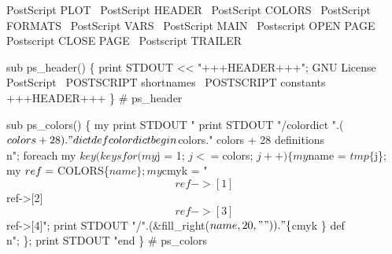 \documentclass[11pt]{article}
\def\nwendcode{\endtrivlist \endgroup} %
\let\nwdocspar=\par                    %
\begin{document}
\nwenddocs{}\endmoddef
\LA{}PostScript PLOT~{\nwtagstyle{}}\RA{}
\LA{}PostScript HEADER~{\nwtagstyle{}}\RA{}
\LA{}PostScript COLORS~{\nwtagstyle{}}\RA{}
\LA{}PostScript FORMATS~{\nwtagstyle{}}\RA{}
\LA{}PostScript VARS~{\nwtagstyle{}}\RA{}
\LA{}PostScript MAIN~{\nwtagstyle{}}\RA{}
\LA{}Postscript OPEN PAGE~{\nwtagstyle{}}\RA{}
\LA{}Postscript CLOSE PAGE~{\nwtagstyle{}}\RA{}
\LA{}Postscript TRAILER~{\nwtagstyle{}}\RA{}
\nwendcode{}\nwdocspar

 
\nwenddocs{}\endmoddef
sub ps_header() \{
    print STDOUT << "+++HEADER+++";
%
\LA{}GNU License PostScript~{\nwtagstyle{}}\RA{}
%
%
%
%
\LA{}POSTSCRIPT shortnames~{\nwtagstyle{}}\RA{}
\LA{}POSTSCRIPT constants~{\nwtagstyle{}}\RA{}
+++HEADER+++
\} # ps_header
\nwendcode{}\nwdocspar


\nwenddocs{}\endmoddef
sub ps_colors() \{
  my %
  print STDOUT "%
  print STDOUT "/colordict ".($colors + 28)." dict def colordict begin %
               $colors." colors + 28 definitions\\n";
  foreach my $key (keys %
  for (my $j = 1; $j <= $colors; $j++) \{ 
      my $name = $tmp\{$j\};
      my $ref = \\$COLORS\{$name\};
      my $cmyk = "$$ref->[1] $$ref->[2] $$ref->[3] $$ref->[4]";
      print STDOUT "/".(&fill_right($name,20," "))."\{ $cmyk \} def\\n";
      \};
  print STDOUT "end %
\} # ps_colors
\nwendcode{}\nwdocspar
\end{document}
